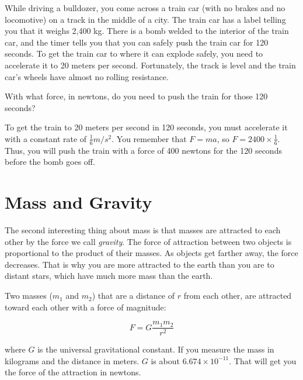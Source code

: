 \begin{Exercise}[title={Acceleration}, label=acceleration_train]

While driving a bulldozer, you come across a train car (with no brakes
and no locomotive) on a track in the middle of a city. The train car
has a label telling you that it weighs 2,400 kg. There is a bomb
welded to the interior of the train car, and the timer tells you that
you can safely push the train car for 120 seconds. To get the train
car to where it can explode safely, you need to accelerate it to 20 meters per
second. Fortunately, the track is level and the train car's wheels have
almost no rolling resistance.

With what force, in newtons, do you need to push the train for those 120 seconds?

\end{Exercise}
\begin{Answer}[ref=acceleration_train]
To get the train to 20 meters per second in 120 seconds, you must
accelerate it with a constant rate of $\frac{1}{6} m/s^2$. You
remember that $F = m a$, so $F = 2400 \times \frac{1}{6}$. Thus, you
will push the train with a force of 400 newtons for the 120 seconds
before the bomb goes off.
\end{Answer}

\section{Mass and Gravity}

The second interesting thing about mass is that masses are
attracted to each other by the force we call \textit{gravity}. The
force of attraction between two objects is proportional to the product
of their masses. As objects get farther away, the force decreases.
That is why you are more attracted to the earth than you are to
distant stars, which have much more mass than the earth.

\begin{mdframed}[style=important, frametitle={Newton's Law of Universal Gravitation}]

Two masses ($m_1$ and $m_2$) that are a distance of
$r$ from each other, are attracted toward each other with a force of
magnitude:

$$F = G\frac{m_1 m_2}{r^2}$$

where $G$ is the universal gravitational constant. If you measure the
mass in kilograms and the distance in meters. $G$ is about $6.674
\times 10^{-11}$.  That will get you the force of the attraction in
newtons.

\end{mdframed}

